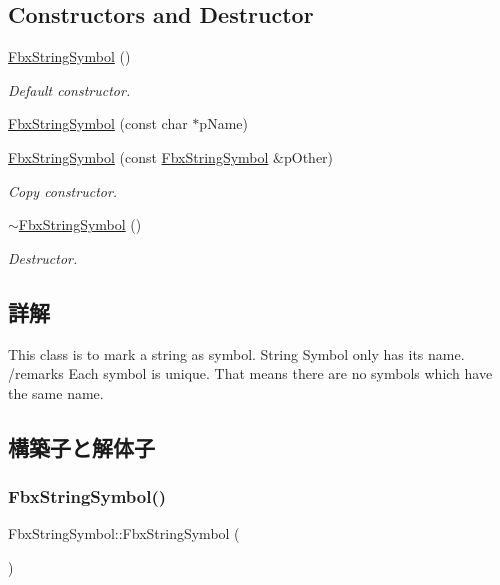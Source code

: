 \subsection*{Constructors and Destructor}
\begin{DoxyCompactItemize}
\item 
\hyperlink{class_fbx_string_symbol_a06af2f7b75ba61f8e3e97589d1cec76c}{Fbx\+String\+Symbol} ()
\begin{DoxyCompactList}\small\item\em Default constructor. \end{DoxyCompactList}\item 
\hyperlink{class_fbx_string_symbol_a245670546cbcfdf41514964b1a6bef90}{Fbx\+String\+Symbol} (const char $\ast$p\+Name)
\item 
\hyperlink{class_fbx_string_symbol_a586aec49bc085596bfa5b809a9948c3c}{Fbx\+String\+Symbol} (const \hyperlink{class_fbx_string_symbol}{Fbx\+String\+Symbol} \&p\+Other)
\begin{DoxyCompactList}\small\item\em Copy constructor. \end{DoxyCompactList}\item 
\hyperlink{class_fbx_string_symbol_a46f59347767596c5482dde0ecef7cdb1}{$\sim$\+Fbx\+String\+Symbol} ()
\begin{DoxyCompactList}\small\item\em Destructor. \end{DoxyCompactList}\end{DoxyCompactItemize}


\subsection{詳解}
This class is to mark a string as symbol. String Symbol only has its name. /remarks Each symbol is unique. That means there are no symbols which have the same name. 

\subsection{構築子と解体子}
\mbox{\label{class_fbx_string_symbol_a06af2f7b75ba61f8e3e97589d1cec76c}} 
\subsubsection{\texorpdfstring{Fbx\+String\+Symbol()}{FbxStringSymbol()}\hspace{0.1cm}{\footnotesize\ttfamily [1/3]}}
{\footnotesize\ttfamily Fbx\+String\+Symbol\+::\+Fbx\+String\+Symbol (\begin{DoxyParamCaption}{ }\end{DoxyParamCaption})}



